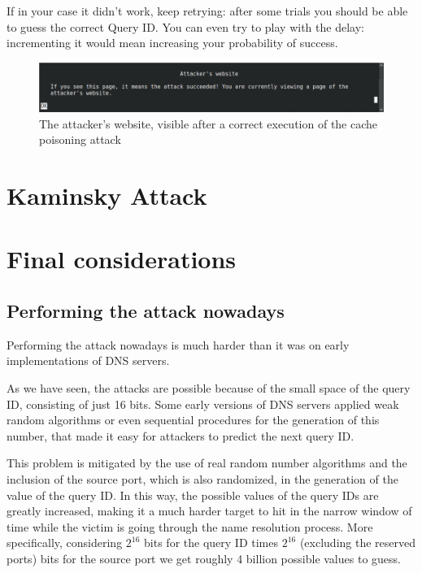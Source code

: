 \documentclass[11pt,a4paper]{article}
\begin{document}
\noindent
If in your case it didn't work, keep retrying: after some trials you should be able to guess the correct Query ID. You can even try to play with the delay: incrementing it would mean increasing your probability of success.

\begin{figure}
    \centering
    \includegraphics[width=\textwidth]{attacker-website.png}
    \caption{The attacker's website, visible after a correct execution of the cache poisoning attack}
    \label{fig:attacker-website}
\end{figure}

\newpage
\section{Kaminsky Attack}

\section{Final considerations}
\label{sec:final-considerations}

\subsection{Performing the attack nowadays}

Performing the attack nowadays is much harder than it was on early implementations of DNS servers. 

\noindent
As we have seen, the attacks are possible because of the small space of the query ID, consisting of just 16 bits. Some early versions of DNS servers applied weak random algorithms or even sequential procedures for the generation of this number, that made it easy for attackers to predict the next query ID.

\noindent
This problem is mitigated by the use of real random number algorithms and the inclusion of the source port, which is also randomized, in the generation of the value of the query ID. In this way, the possible values of the query IDs are greatly increased, making it a much harder target to hit in the narrow window of time while the victim is going through the name resolution process. More specifically, considering $2^{16}$ bits for the query ID times $2^{16}$ (excluding the reserved ports) bits for the source port we get roughly 4 billion possible values to guess.
\end{document}
